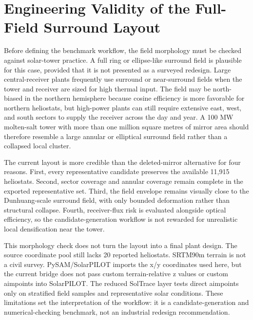 \documentclass[final,3p,times]{elsarticle}
\begin{document}
\section{Engineering Validity of the Full-Field Surround Layout}
Before defining the benchmark workflow, the field morphology must be checked against solar-tower practice. A full ring or ellipse-like surround field is plausible for this case, provided that it is not presented as a surveyed redesign. Large central-receiver plants frequently use surround or near-surround fields when the tower and receiver are sized for high thermal input. The field may be north-biased in the northern hemisphere because cosine efficiency is more favorable for northern heliostats, but high-power plants can still require extensive east, west, and south sectors to supply the receiver across the day and year. A 100 MW molten-salt tower with more than one million square metres of mirror area should therefore resemble a large annular or elliptical surround field rather than a collapsed local cluster.

The current layout is more credible than the deleted-mirror alternative for four reasons. First, every representative candidate preserves the available 11,915 heliostats. Second, sector coverage and annular coverage remain complete in the exported representative set. Third, the field envelope remains visually close to the Dunhuang-scale surround field, with only bounded deformation rather than structural collapse. Fourth, receiver-flux risk is evaluated alongside optical efficiency, so the candidate-generation workflow is not rewarded for unrealistic local densification near the tower.

This morphology check does not turn the layout into a final plant design. The source coordinate pool still lacks 20 reported heliostats. SRTM90m terrain is not a civil survey. PySAM/SolarPILOT imports the x/y coordinates used here, but the current bridge does not pass custom terrain-relative z values or custom aimpoints into SolarPILOT. The reduced SolTrace layer tests direct aimpoints only on stratified field samples and representative solar conditions. These limitations set the interpretation of the workflow: it is a candidate-generation and numerical-checking benchmark, not an industrial redesign recommendation.
\end{document}
